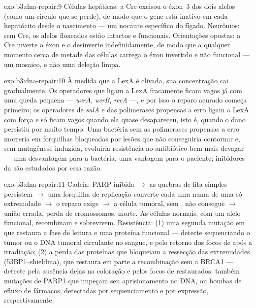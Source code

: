\begin{solution}{exo:b3:dna-repair:9}
Células hepáticas: a Cre excisou o éxon~3 dos dois alelos (como um
círculo que se perde), de modo que o gene está inativo em cada
hepatócito desde o nascimento --- um nocaute específico do fígado.
Neurônios: sem Cre, os alelos floxeados estão intactos e funcionais.
Orientações opostas: a Cre inverte o éxon e o desinverte
indefinidamente, de modo que a qualquer momento cerca de metade das
células carrega o éxon invertido e não funcional --- um mosaico, e não
uma deleção limpa.
\end{solution}

\begin{solution}{exo:b3:dna-repair:10}
À medida que a LexA é clivada, sua concentração cai gradualmente. Os
operadores que ligam a LexA fracamente ficam vagos já com uma queda
pequena --- \emph{uvrA}, \emph{uvrB}, \emph{recA} ---, e por isso o
reparo acurado começa primeiro; os operadores de \emph{sulA} e das
polimerases propensas a erro ligam a LexA com força e só ficam vagos
quando ela quase desapareceu, isto é, quando o dano persistiu por
muito tempo. Uma bactéria sem as polimerases propensas a erro morreria
em forquilhas bloqueadas por lesões que não conseguiria contornar e,
sem mutagênese induzida, evoluiria resistência ao antibiótico bem mais
devagar --- uma desvantagem para a bactéria, uma vantagem para o
paciente; inibidores da  são estudados por essa razão.
\end{solution}

\begin{solution}{exo:b3:dna-repair:11}
Cadeia: PARP inibida $\to$ as quebras de fita simples persistem $\to$
uma forquilha de replicação converte cada uma numa  de uma só extremidade $\to$ o reparo exige 
$\to$ a célula tumoral, sem , não consegue $\to$ união errada,
perda de cromossomos, morte. As células normais, com um alelo
funcional, recombinam e sobrevivem. Resistência: (1) uma segunda
mutação em \emph{} que restaura a fase de leitura e uma proteína
funcional --- detecte sequenciando o tumor ou o DNA tumoral circulante
no sangue, e pelo retorno dos focos de  após a irradiação; (2) a
perda das proteínas que bloqueiam a ressecção das extremidades
(53BP1--shieldina), que restaura em parte a recombinação sem a BRCA1
--- detecte pela ausência delas na coloração e pelos focos de 
restaurados; também mutações de PARP1 que impeçam seu aprisionamento
no DNA, ou bombas de efluxo de fármacos, detectadas por sequenciamento
e por expressão, respectivamente.
\end{solution}

